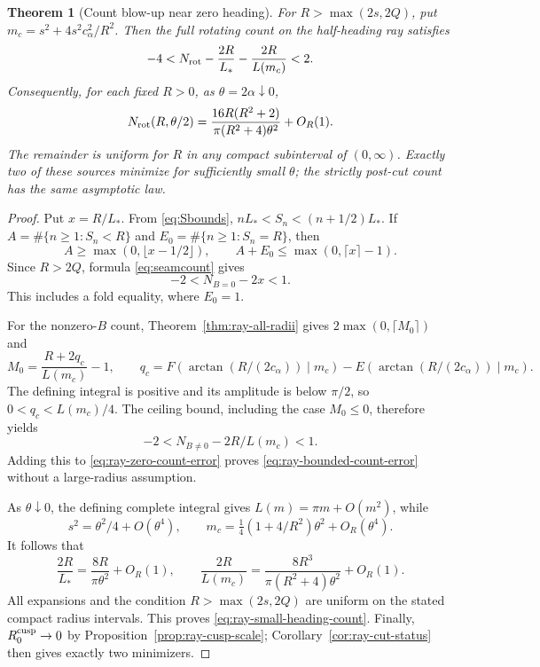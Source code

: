 \documentclass[11pt,a4paper]{article}
\newtheorem{theorem}{Theorem}[section]
\theoremstyle{remark}\newtheorem{remark}[theorem]{Remark}
\begin{document}
\begin{theorem}[Count blow-up near zero heading]\label{thm:ray-small-heading-count}
For $R>\max(2s,2Q)$, put $m_c=s^2+4s^2c_\alpha^2/R^2$.
Then the full rotating count on the half-heading ray satisfies
\begin{equation}\label{eq:ray-bounded-count-error}
 -4<N_{\rm rot}-\frac{2R}{L_*}-\frac{2R}{L(m_c)}<2.
\end{equation}
Consequently, for each fixed $R>0$, as $\theta=2\alpha\downarrow0$,
\begin{equation}\label{eq:ray-small-heading-count}
 N_{\rm rot}(R,\theta/2)
 =\frac{16R(R^2+2)}{\pi(R^2+4)\theta^2}+O_R(1).
\end{equation}
The remainder is uniform for $R$ in any compact subinterval of
$(0,\infty)$. Exactly two of these sources minimize for sufficiently
small $\theta$; the strictly post-cut count has the same asymptotic law.
\end{theorem}
\begin{proof}
Put $x=R/L_*$. From \eqref{eq:Sbounds},
$nL_*<S_n<(n+1/2)L_*$. If
$A=\#\{n\ge1:S_n<R\}$ and $E_0=\#\{n\ge1:S_n=R\}$, then
\[
 A\ge\max(0,\lfloor x-1/2\rfloor),\qquad
 A+E_0\le\max(0,\lceil x\rceil-1).
\]
Since $R>2Q$, formula \eqref{eq:seamcount} gives
\begin{equation}\label{eq:ray-zero-count-error}
 -2<N_{B=0}-2x<1.
\end{equation}
This includes a fold equality, where $E_0=1$.

For the nonzero-$B$ count, Theorem~\ref{thm:ray-all-radii} gives
$2\max(0,\lceil M_0\rceil)$ and
\[
 M_0=\frac{R+2q_c}{L(m_c)}-1,\qquad
 q_c=F(\arctan(R/(2c_\alpha))\mid m_c)
       -E(\arctan(R/(2c_\alpha))\mid m_c).
\]
The defining integral is positive and its amplitude is below $\pi/2$,
so $0<q_c<L(m_c)/4$. The ceiling bound, including the case
$M_0\le0$, therefore yields
\[
 -2<N_{B\ne0}-2R/L(m_c)<1.
\]
Adding this to \eqref{eq:ray-zero-count-error} proves
\eqref{eq:ray-bounded-count-error} without a large-radius assumption.

As $\theta\downarrow0$, the defining complete integral gives
$L(m)=\pi m+O(m^2)$, while
\[
 s^2=\theta^2/4+O(\theta^4),\qquad
 m_c=\tfrac14(1+4/R^2)\theta^2+O_R(\theta^4).
\]
It follows that
\[
 \frac{2R}{L_*}=\frac{8R}{\pi\theta^2}+O_R(1),\qquad
 \frac{2R}{L(m_c)}=\frac{8R^3}{\pi(R^2+4)\theta^2}+O_R(1).
\]
All expansions and the condition $R>\max(2s,2Q)$ are uniform on the
stated compact radius intervals. This proves
\eqref{eq:ray-small-heading-count}. Finally,
$R_0^{\rm cusp}\to0$ by Proposition~\ref{prop:ray-cusp-scale};
Corollary~\ref{cor:ray-cut-status} then gives exactly two minimizers.
\end{proof}
\end{document}
